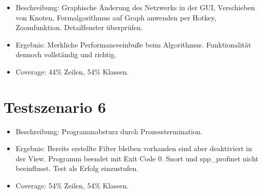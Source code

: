\begin{itemize}
  \item Beschreibung: Graphische Änderung des Netzwerks in der GUI, Verschieben von Knoten, Formalgorithmus auf Graph anwenden per Hotkey, Zoomfunktion. Detailfenster überprüfen.
  \item Ergebnis: Merkliche Performanceeinbuße beim Algorithmus. Funktionalität dennoch vollständig und richtig.
  \item Coverage: 44\% Zeilen, 54\% Klassen.
\end{itemize}

\section{Testszenario 6}

\begin{itemize}
  \item Beschreibung: Programmabsturz durch Prozesstermination.
  \item Ergebnis: Bereits erstellte Filter bleiben vorhanden sind aber deaktiviert in der View. Programm beendet mit Exit Code 0. Snort und spp\_profinet nicht beeinflusst. Test als Erfolg einzustufen.
  \item Coverage: 54\% Zeilen, 54\% Klassen.
\end{itemize} 